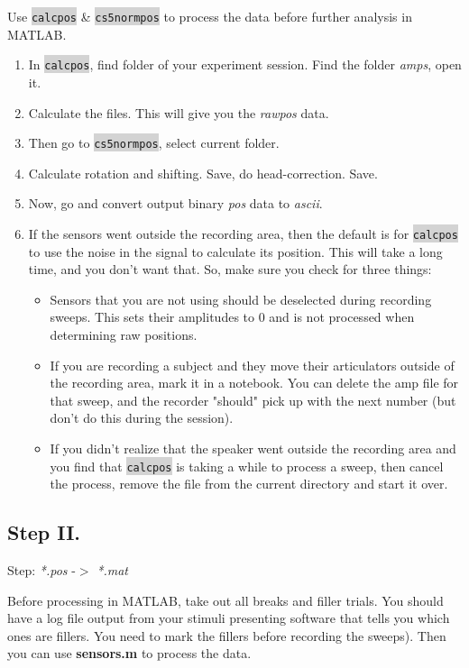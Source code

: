 \documentclass[12pt]{article}
\begin{document}
	Use \colorbox{lightgray}{\texttt{calcpos}} \& \colorbox{lightgray}{\texttt{cs5normpos}} to process the data before further analysis in MATLAB.
	\begin{enumerate}
	    \item In \colorbox{lightgray}{\texttt{calcpos}}, find folder of your experiment session. Find the folder \emph{amps}, open it.
	    \item Calculate the files. This will give you the \emph{rawpos} data.
	    \item Then go to \colorbox{lightgray}{\texttt{cs5normpos}}, select current folder.
	    \item Calculate rotation and shifting. Save, do head-correction. Save.
	    \item Now, go and convert output binary \emph{pos} data to \emph{ascii}.
        \item If the sensors went outside the recording area, then the default is for \colorbox{lightgray}{\texttt{calcpos}} to use the noise in the signal to calculate its position. This will take a long time, and you don't want that. So, make sure you check for three things:
	        \begin{itemize}
	            \item Sensors that you are not using should be deselected during recording sweeps. This sets their amplitudes to 0 and is not processed when determining raw positions.
	            \item If you are recording a subject and they move their articulators outside of the recording area, mark it in a notebook. You can delete the amp file for that sweep, and the recorder "should" pick up with the next number (but don't do this during the session). 
	            \item If you didn't realize that the speaker went outside the recording area and you find that \colorbox{lightgray}{\texttt{calcpos}} is taking a while to process a sweep, then cancel the process, remove the file from the current directory and start it over.
	        \end{itemize}
	\end{enumerate}
    
\subsection{Step II.}
Step: \emph{*.pos} -$>$ \emph{*.mat}
\vspace{12pt}

Before processing in MATLAB, take out all breaks and filler trials. You should have a log file output from your stimuli presenting software that tells you which ones are fillers. You need to mark the fillers before recording the sweeps). Then you can use \textbf{sensors.m} to process the data.
\end{document}
